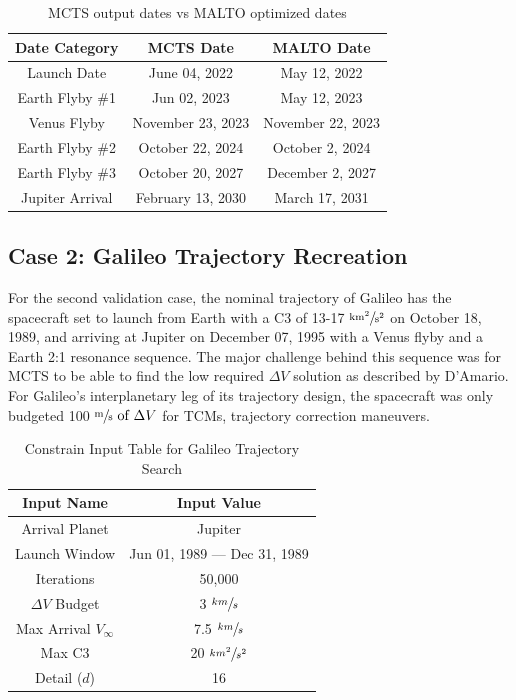 \documentclass[letterpaper, preprint, paper,11pt]{AAS}	%
\begin{document}
\begin{table}[tb]
    \begin{center}
        \caption{MCTS output dates vs MALTO optimized dates}
        \label{table:clipMInputs}
        \begin{tabular}{c|c|c}
            \textbf{Date Category} & \textbf{MCTS Date} & \textbf{MALTO Date}\\
            \hline
            Launch Date & June 04, 2022 & May 12, 2022 \\
            Earth Flyby \#1 & Jun 02, 2023 & May 12, 2023 \\
            Venus Flyby & November 23, 2023 & November 22, 2023 \\ 
            Earth Flyby \#2 & October 22, 2024 & October 2, 2024 \\
            Earth Flyby \#3 & October 20, 2027 & December 2, 2027 \\
            Jupiter Arrival & February 13, 2030 & March 17, 2031 \\
        \end{tabular}
    \end{center}
\end{table}

\subsection{Case 2: Galileo Trajectory Recreation}

For the second validation case, the nominal trajectory of Galileo has the spacecraft set to launch from Earth with a C3 of 13-17 $\sfrac{\text{km}^2}{\text{s}^2}$ on October 18, 1989, and arriving at Jupiter on December 07, 1995 with a Venus flyby and a Earth 2:1 resonance sequence. The major challenge behind this sequence was for MCTS to be able to find the low required $\Delta V$ solution as described by D'Amario\cite{DAmario1992}. For Galileo's interplanetary leg of its trajectory design, the spacecraft was only budgeted 100 $\sfrac{\text{m}}{\text{s}} \text{ of } \Delta V$ for TCMs, trajectory correction maneuvers. 

\begin{table}[htb]
    \begin{center}
        \caption{Constrain Input Table for Galileo Trajectory Search}
        \label{table:galiInputs}
        \begin{tabular}{c|c}
            \textbf{Input Name} & \textbf{Input Value}\\
            \hline
            Arrival Planet & Jupiter \\
            Launch Window & Jun 01, 1989 --- Dec 31, 1989 \\
            Iterations & 50,000 \\ 
            $\Delta V$ Budget & 3 $\sfrac{km}{s}$ \\
            Max Arrival $V_{\infty}$ & 7.5 $\sfrac{km}{s}$  \\
            Max C3 & 20 $\sfrac{km^2}{s^2}$ \\
            Detail ($d$) & 16 
        \end{tabular}
    \end{center}
\end{table}
\end{document}
